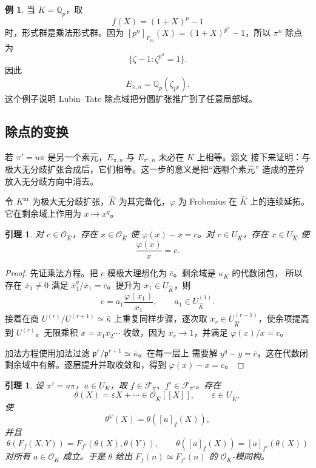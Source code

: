\documentclass[11pt,a4paper,openany]{ctexbook}
\numberwithin{equation}{chapter}
\newcommand{\Q}{\mathbb{Q}}
\theoremstyle{plain}
\newtheorem{lemma}[theorem]{引理}
\theoremstyle{definition}
\newtheorem{example}[theorem]{例}
\theoremstyle{remark}
\begin{document}
\begin{example}
当 $K=\Q_p$，取
\[
f(X)=(1+X)^p-1
\]
时，形式群是乘法形式群。因为 $[p^n]_{F_m}(X)=(1+X)^{p^n}-1$，所以
$\pi^n$ 除点为
\[
\{\zeta-1:\zeta^{p^n}=1\}.
\]
因此
\[
E_{\pi,n}=\Q_p(\zeta_{p^n}).
\]
这个例子说明 Lubin--Tate 除点域把分圆扩张推广到了任意局部域。
\end{example}

\subsection{除点的变换}

若 $\pi'=u\pi$ 是另一个素元，$E_{\pi,n}$ 与 $E_{\pi',n}$ 未必在 $K$ 上相等。源文
接下来证明：与极大无分歧扩张合成后，它们相等。这一步的意义是把“选哪个素元”
造成的差异放入无分歧方向中消去。

令 $K^{\mathrm{nr}}$ 为极大无分歧扩张，$\widehat K$ 为其完备化，$\varphi$ 为
Frobenius 在 $\widehat K$ 上的连续延拓。它在剩余域上作用为 $x\mapsto x^q$。

\begin{lemma}
对 $c\in\mathcal O_{\widehat K}$，存在 $x\in\mathcal O_{\widehat K}$ 使
$\varphi(x)-x=c$。对 $c\in U_{\widehat K}$，存在 $x\in U_{\widehat K}$ 使
\[
\frac{\varphi(x)}x=c.
\]
\end{lemma}

\begin{proof}
先证乘法方程。把 $c$ 模极大理想化为 $\bar c$。剩余域是 $\kappa_K$ 的代数闭包，
所以存在 $\bar x_1\ne0$ 满足 $\bar x_1^q/\bar x_1=\bar c$。提升为
$x_1\in U_{\widehat K}$，则
\[
c=a_1\frac{\varphi(x_1)}{x_1},\qquad a_1\in U_{\widehat K}^{(1)}.
\]
接着在商 $U^{(r)}/U^{(r+1)}\simeq\bar\kappa$ 上重复同样步骤，逐次取
$x_r\in U_{\widehat K}^{(r-1)}$，使余项提高到 $U^{(r)}$。无限乘积
$x=x_1x_2\cdots$ 收敛，因为 $x_r\to1$，并满足 $\varphi(x)/x=c$。

加法方程使用加法过滤 $\mathfrak p^r/\mathfrak p^{r+1}\simeq\bar\kappa$。在每一层上
需要解 $y^q-y=\bar c$，这在代数闭剩余域中有解。逐层提升并取收敛和，得到
$\varphi(x)-x=c$。
\end{proof}

\begin{lemma}
设 $\pi'=u\pi$，$u\in U_K$，取 $f\in\mathcal F_\pi$、$f'\in\mathcal F_{\pi'}$。存在
\[
\theta(X)=\varepsilon X+\cdots\in\mathcal O_{\widehat K}[[X]],\qquad
\varepsilon\in U_{\widehat K},
\]
使
\[
\theta^\varphi(X)=\theta([u]_f(X)),
\]
并且
\[
\theta(F_f(X,Y))=F_{f'}(\theta(X),\theta(Y)),\qquad
\theta([a]_f(X))=[a]_{f'}(\theta(X))
\]
对所有 $a\in\mathcal O_K$ 成立。于是 $\theta$ 给出
$F_f(n)\simeq F_{f'}(n)$ 的 $\mathcal O_K$-模同构。
\end{lemma}
\end{document}
